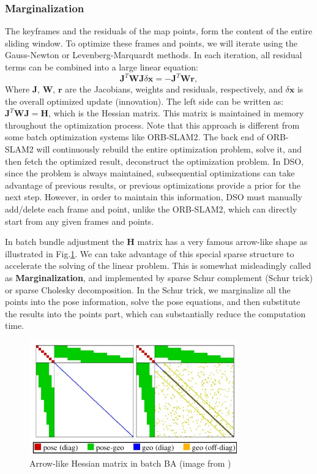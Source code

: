 \documentclass[a4paper,10pt]{article}
\begin{document}
	\subsubsection{Marginalization}
	The keyframes and the residuals of the map points, form the content of the entire sliding window. To optimize these frames and points, we will iterate using the Gauss-Newton or Levenberg-Marquardt methods. In each iteration, all residual terms can be combined into a large linear equation:
	\begin{equation}
	\mathbf{J}^T \mathbf{W} \mathbf{J} \delta \mathbf{x}=-\mathbf{J}^T \mathbf{W} \mathbf{r},
	\end{equation}
	Where $\mathbf{J}$, $\mathbf{W}$, $\mathbf{r}$ are the Jacobians, weights and residuals, respectively, and $\delta \mathbf{x}$ is the overall optimized update (innovation). The left side can be written as: $\mathbf{J}^T \mathbf{WJ}=\mathbf{H}$, which is the Hessian matrix. This matrix is maintained in memory throughout the optimization process. Note that this approach is different from some batch optimization systems like ORB-SLAM2. The back end of ORB-SLAM2 will continuously rebuild the entire optimization problem, solve it, and then fetch the optimized result, deconstruct the optimization problem. In DSO, since the problem is always maintained, subsequential optimizations can take advantage of previous results, or previous optimizations provide a prior for the next step. However, in order to maintain this information, DSO must manually add/delete each frame and point, unlike the ORB-SLAM2, which can directly start from any given frames and points.
	
	In batch bundle adjustment the $\mathbf{H}$ matrix has a very famous arrow-like shape as illustrated in Fig.\ref{fig:H-dso}. We can take advantage of this special sparse structure to accelerate the solving of the linear problem. This is somewhat misleadingly called as \textbf{Marginalization}, and implemented by sparse Schur complement (Schur trick) or sparse Cholesky decomposition. In the Schur trick, we marginalize all the points into the pose information, solve the pose equations, and then substitute the results into the points part, which can substantially reduce the computation time. 
	
	\begin{figure}[!thp]
		\centering
		\includegraphics[width=0.8\textwidth]{figs/H.jpg}
		\caption{Arrow-like Hessian matrix in batch BA (image from \cite{engel2018direct})}
		\label{fig:H-dso}
	\end{figure}
		
\end{document}
